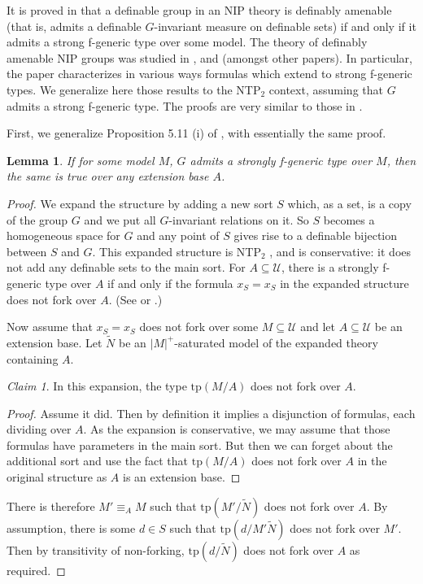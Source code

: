 \documentclass[12pt]{article}
\newtheorem{lemme}[thm]{Lemma}
\theoremstyle{definition}
\theoremstyle{mystyle}
\theoremstyle{remark}
\newtheorem*{claim}{Claim}
\newenvironment{claimproof}
    {\begin{proof}}{\renewcommand\qedsymbol{\Squarepipe} \end{proof}}
\newcommand{\monster}{\mathcal U}
\newcommand{\ntp}{NTP$_2$ }
\newcommand{\tp}{\mathrm{tp}}
\begin{document}
It is proved in \cite{NIP2} that a definable group in an NIP theory is definably amenable (that is, admits a definable $G$-invariant measure on definable sets) if and only if it admits a strong f-generic type over some model. The theory of definably amenable NIP groups was studied in \cite{NIP1}, \cite{NIP2} and \cite{CS} (amongst other papers). In particular, the paper \cite{CS} characterizes in various ways formulas which extend to strong f-generic types. We generalize here those results to the NTP$_2$ context, assuming that $G$ admits a strong f-generic type. The proofs are very similar to those in \cite{CS}.


First, we generalize Proposition 5.11 (i) of \cite{NIP2}, with essentially the same proof.

\begin{lemme}
If for some model $M$, $G$ admits a strongly f-generic type over $M$, then the same is true over any extension base $A$.
\end{lemme}
\begin{proof}
We expand the structure by adding a new sort $S$ which, as a set, is a copy of the group $G$ and we put all $G$-invariant relations on it. So $S$ becomes a homogeneous space for $G$ and any point of $S$ gives rise to a definable bijection between $S$ and $G$. This expanded structure is \ntp, and is conservative: it does not add any definable sets to the main sort. For $A\subseteq \monster$, there is a strongly f-generic type over $A$ if and only if the formula $x_S = x_S$ in the expanded structure does not fork over $A$. (See \cite[Proposition 5.11]{NIP2} or \cite[Lemma 8.19]{NIPbook}.)

Now assume that $x_S = x_S$ does not fork over some $M\subseteq \monster$ and let $A\subseteq \monster$ be an extension base. Let $\tilde N$ be an $|M|^+$-saturated model of the expanded theory containing $A$.

\begin{claim} In this expansion, the type $\tp(M/A)$ does not fork over $A$.
\end{claim}

\begin{claimproof} Assume it did. Then by definition it implies a disjunction of formulas, each dividing over $A$. As the expansion is conservative, we may assume that those formulas have parameters in the main sort. But then we can forget about the additional sort and use the fact that $\tp(M/A)$ does not fork over $A$ in the original structure as $A$ is an extension base.
\end{claimproof}

There is therefore $M'\equiv_A M$ such that $\tp(M'/\tilde N)$ does not fork over $A$. By assumption, there is some $d\in S$ such that $\tp(d/M'\tilde N)$ does not fork over $M'$. Then by transitivity of non-forking, $\tp(d/\tilde N)$ does not fork over $A$ as required.
\end{proof}
\end{document}

